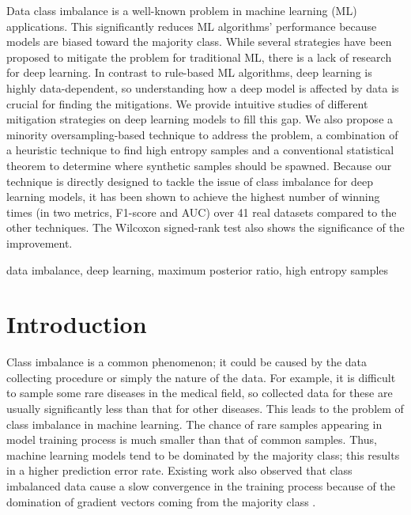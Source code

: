 \documentclass[journal]{IEEEtai}
\begin{document}
\begin{IEEEImpStatement}
	Data class imbalance is a well-known problem in machine learning (ML) applications. This significantly reduces ML algorithms' performance because models are biased toward the majority class. While several strategies have been proposed to mitigate the problem for traditional ML, there is a lack of research for deep learning. In contrast to rule-based ML algorithms, deep learning is highly data-dependent, so understanding how a deep model is affected by data is crucial for finding the mitigations. We provide intuitive studies of different mitigation strategies on deep learning models to fill this gap. We also propose a minority oversampling-based technique to address the problem, a combination of a heuristic technique to find high entropy samples and a conventional statistical theorem to determine where synthetic samples should be spawned. Because our technique is directly designed to tackle the issue of class imbalance for deep learning models, it has been shown to achieve the highest number of winning times (in two metrics, F1-score and AUC) over 41 real datasets compared to the other techniques. The Wilcoxon signed-rank test also shows the significance of the improvement.   
\end{IEEEImpStatement}


\begin{IEEEkeywords}
	data imbalance, deep learning, maximum posterior ratio, high entropy samples  
\end{IEEEkeywords}


\section{Introduction}
Class imbalance is a common phenomenon; it could be caused by the data collecting procedure or simply the nature of the data. For example, it is difficult to sample some rare diseases in the medical field, so collected data for these are usually significantly less than that for other diseases. This leads to the problem of class imbalance in machine learning. The chance of rare samples appearing in model training process is much smaller than that of common samples. Thus, machine learning models tend to be dominated by the majority class; this results in a higher prediction error rate. Existing work also observed that class imbalanced data cause a slow convergence in the training process because of the domination of gradient vectors coming from the majority class \cite{ya-guan_emsgd:_2020, liu_high-performance_2020}. 
\end{document}

